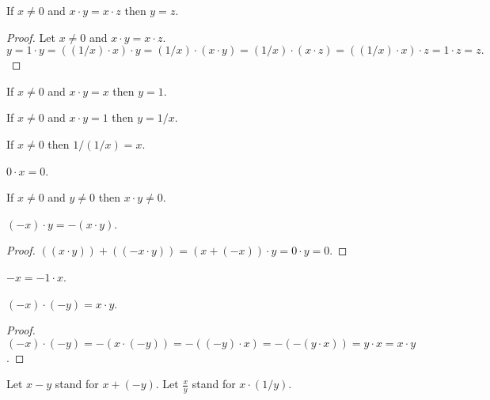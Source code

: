 \documentclass{article}
\begin{document}
\begin{forthel}
\begin{proposition}[1 15 a]
If $x \neq 0$ and $x \cdot y = x \cdot z$
then $y = z$.
\end{proposition}
\begin{proof}
Let $x \neq 0$ and $x \cdot y = x \cdot z$.
\[ y = 1 \cdot y = ((1/x) \cdot x) \cdot y = (1/x) \cdot (x \cdot y) =
(1/x) \cdot (x \cdot z) = ((1/x) \cdot x) \cdot z = 1 \cdot z = z. \]
\end{proof}

\begin{proposition}[1 15 b]
If $x \neq 0$ and $x \cdot y = x$ then $y = 1$.
\end{proposition}

\begin{proposition}[1 15 c]
If $x \neq 0$ and $x \cdot y = 1$ then $y = 1/x$.
\end{proposition}

\begin{proposition}[1 15 d]
If $x \neq 0$ then $1/(1/x) = x$.
\end{proposition}

\begin{proposition}[1 16 a]
$0 \cdot x = 0$.
\end{proposition}

\begin{proposition}[1 16 b]
If $x \neq 0$ and $y \neq 0$ then $x \cdot y \neq 0$.
\end{proposition}

\begin{proposition}[1 16 c]
$(-x) \cdot y = -(x \cdot y)$.
\end{proposition}
\begin{proof}
$((x \cdot y)) + ((-x \cdot y)) = (x + (-x)) \cdot y
= 0 \cdot y = 0$.
\end{proof}

\begin{proposition}
$-x = -1 \cdot x$.
\end{proposition}

\begin{proposition}[1 16d]
$(-x) \cdot (-y) = x \cdot y$.
\end{proposition}
\begin{proof}
$(-x)\cdot (-y) = -(x\cdot(-y)) = -((-y)\cdot x) =
-(-(y\cdot x)) = y\cdot x = x\cdot y$.
\end{proof}

Let $x - y$ stand for $x + (-y)$.
Let $\frac{x}{y}$ stand for $x \cdot (1/y)$.

\end{forthel}
\end{document}
